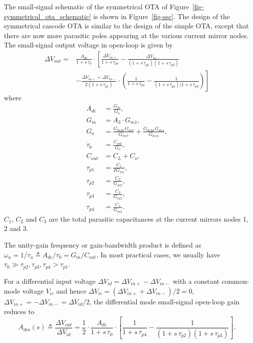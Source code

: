 \documentclass[
  a4paper,
  DIV=11,
  numbers=noendperiod]{scrreprt}
\begin{document}
The small-signal schematic of the symmetrical OTA of
Figure~\ref{fig-symmetrical_ota_schematic} is shown in
Figure~\ref{fig-ssc}. The design of the symmetrical cascode OTA is
similar to the design of the simple OTA, except that there are now more
parasitic poles appearing at the various current mirror nodes. The
small-signal output voltage in open-loop is given by \begin{align}
  \Delta V_{out} =& \frac{A_{dc}}{1+s\,\tau_0} \cdot \left[\frac{\Delta V_{in+}}{1+s\,\tau_{p4}} - \frac{\Delta V_{in-}}{(1+s\,\tau_{p2})(1+s\,\tau_{p3})}\right.\\
  &\left.-\frac{\Delta V_{in+}+\Delta V_{in-}}{2(1+s\,\tau_{p1})} \cdot \left(\frac{1}{1+s\,\tau_{p4}} - \frac{1}{(1+s\,\tau_{p2})(1+s\,\tau_{p3}}\right)\right]
\end{align} where \begin{align}
  A_{dc} &= \frac{G_m}{G_o},\\
  G_m &= A_3 \cdot G_{m1},\\
  G_o &= \frac{G_{ds3b}\,G_{ds7}}{G_{ms7}} + \frac{G_{ds2d}\,G_{ds4}}{G_{ms4}},\\
  \tau_0 &= \frac{C_{out}}{G_o},\\
  C_{out} &= C_L + C_o,\\
  \tau_{p1} &= \frac{C_1}{2 G_{m1}},\\
  \tau_{p2} &= \frac{C_2}{G_{m2}},\\
  \tau_{p3} &= \frac{C_3}{G_{m3}},\\
  \tau_{p4} &= \frac{C_4}{G_{m2}}.
\end{align} \(C_1\), \(C_2\) and \(C_3\) are the total parasitic
capacitances at the current mirrors nodes 1, 2 and 3.

The unity-gain frequency or gain-bandwidth product is defined as
\(\omega_u = 1/\tau_u \triangleq A_{dc}/\tau_0 = G_m/C_{out}\). In most
practical cases, we usually have
\(\tau_0 \gg \tau_{p2}, \tau_{p3}, \tau_{p4} > \tau_{p1}\).

For a differential input voltage
\(\Delta V_{id}=\Delta V_{in+}-\Delta V_{in-}\) with a constant
common-mode voltage \(V_{ic}\) and hence
\(\Delta V_{ic} = (\Delta V_{in+} + \Delta V_{in-})/2=0\),
\(\Delta V_{in+} = -\Delta V_{in-} = \Delta V_{id}/2\), the differential
mode small-signal open-loop gain reduces to \begin{equation}
  A_{dm}(s) \triangleq \frac{\Delta V_{out}}{\Delta V_{id}} = \frac{1}{2} \cdot \frac{A_{dc}}{1+s\,\tau_0} \cdot \left[\frac{1}{1+s\,\tau_{p4}} - \frac{1}{(1+s\,\tau_{p2})(1+s\,\tau_{p3})}\right].
\end{equation}
\end{document}
